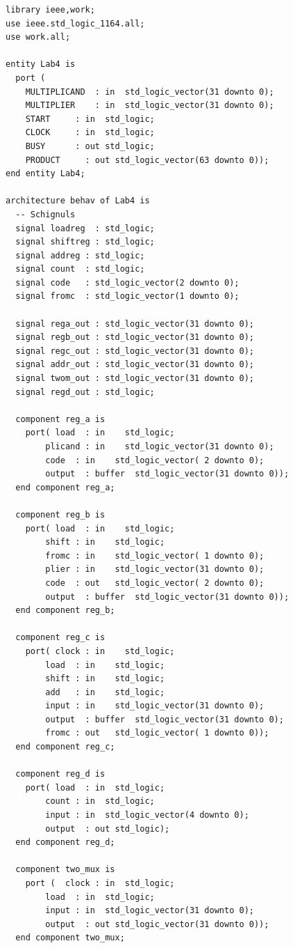 \documentclass[11pt]{report}
\begin{document}
\begin{spacing}{1.5}
\begin{lstlisting}
library ieee,work;
use ieee.std_logic_1164.all;
use work.all;

entity Lab4 is
  port (
    MULTIPLICAND  : in  std_logic_vector(31 downto 0);
    MULTIPLIER    : in  std_logic_vector(31 downto 0);
    START     : in  std_logic;
    CLOCK     : in  std_logic;
    BUSY      : out std_logic;
    PRODUCT     : out std_logic_vector(63 downto 0));
end entity Lab4;

architecture behav of Lab4 is
  -- Schignuls
  signal loadreg  : std_logic;
  signal shiftreg : std_logic;
  signal addreg : std_logic;
  signal count  : std_logic;
  signal code   : std_logic_vector(2 downto 0);
  signal fromc  : std_logic_vector(1 downto 0);

  signal rega_out : std_logic_vector(31 downto 0);
  signal regb_out : std_logic_vector(31 downto 0);
  signal regc_out : std_logic_vector(31 downto 0);
  signal addr_out : std_logic_vector(31 downto 0);
  signal twom_out : std_logic_vector(31 downto 0);
  signal regd_out : std_logic;

  component reg_a is
    port( load  : in    std_logic;
        plicand : in    std_logic_vector(31 downto 0);
        code  : in    std_logic_vector( 2 downto 0);
        output  : buffer  std_logic_vector(31 downto 0));
  end component reg_a;

  component reg_b is
    port( load  : in    std_logic;
        shift : in    std_logic;
        fromc : in    std_logic_vector( 1 downto 0);
        plier : in    std_logic_vector(31 downto 0);
        code  : out   std_logic_vector( 2 downto 0);
        output  : buffer  std_logic_vector(31 downto 0));
  end component reg_b;    

  component reg_c is
    port( clock : in    std_logic;
        load  : in    std_logic;
        shift : in    std_logic;
        add   : in    std_logic;
        input : in    std_logic_vector(31 downto 0);
        output  : buffer  std_logic_vector(31 downto 0);
        fromc : out   std_logic_vector( 1 downto 0));
  end component reg_c;

  component reg_d is
    port( load  : in  std_logic;
        count : in  std_logic;
        input : in  std_logic_vector(4 downto 0);
        output  : out std_logic);
  end component reg_d;

  component two_mux is
    port (  clock : in  std_logic;
        load  : in  std_logic;
        input : in  std_logic_vector(31 downto 0);
        output  : out std_logic_vector(31 downto 0));
  end component two_mux;


\end{lstlisting}
\end{spacing}
\end{document}
